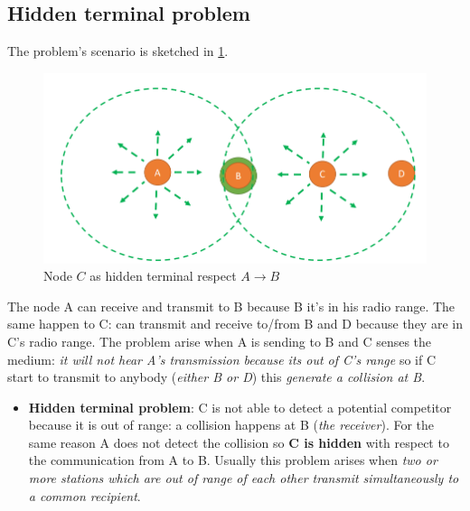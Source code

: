 \documentclass[10pt,a4paper]{report}
\theoremstyle{definition}
\begin{document}
\subsection{Hidden terminal problem}\label{sec:hidden-terminal-problem}
The problem's scenario is sketched in \ref{hidden-terminal}.
\begin{figure}[h!]
	\centering\includegraphics[scale=0.50]{images/Pasted image 20230225100029.png}
	\caption{Node $C$ as hidden terminal respect $A \rightarrow B$}
	\label{hidden-terminal}
\end{figure}
The node A can receive and transmit to B because B it's in his radio range. The same happen to C: can transmit and receive to/from B and D because they are in C's radio range.
The problem arise when A is sending to B and C senses the medium: \textit{it will not hear A's transmission because its out of C's range} so if C start to transmit to anybody (\textit{either B or D}) this \textit{generate a collision at B}.
\begin{itemize}
	\item 
	\textbf{Hidden terminal problem}: C is not able to detect a potential competitor because it is out of range: a collision happens at B (\textit{the receiver}). For the same reason A does not detect the collision so \textbf{C is hidden} with respect to the communication from A to B.
	Usually this problem arises when \textit{two or more stations which are out of range of each other transmit simultaneously to a common recipient}.
\end{itemize}
\end{document}
